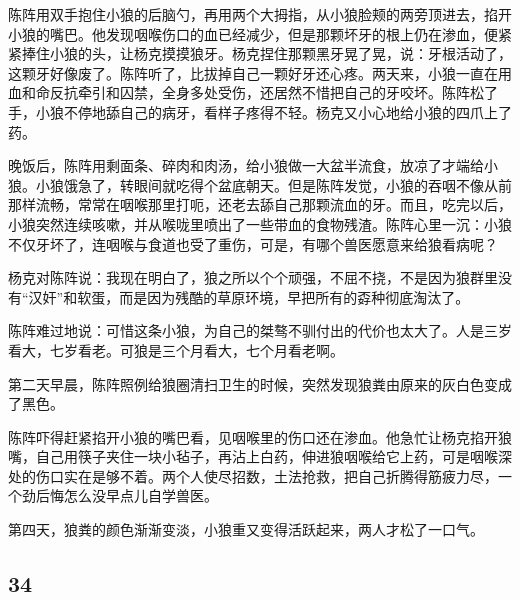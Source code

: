 \par 陈阵用双手抱住小狼的后脑勺，再用两个大拇指，从小狼脸颊的两旁顶进去，掐开小狼的嘴巴。他发现咽喉伤口的血已经减少，但是那颗坏牙的根上仍在渗血，便紧紧捧住小狼的头，让杨克摸摸狼牙。杨克捏住那颗黑牙晃了晃，说：牙根活动了，这颗牙好像废了。陈阵听了，比拔掉自己一颗好牙还心疼。两天来，小狼一直在用血和命反抗牵引和囚禁，全身多处受伤，还居然不惜把自己的牙咬坏。陈阵松了手，小狼不停地舔自己的病牙，看样子疼得不轻。杨克又小心地给小狼的四爪上了药。
\par 晚饭后，陈阵用剩面条、碎肉和肉汤，给小狼做一大盆半流食，放凉了才端给小狼。小狼饿急了，转眼间就吃得个盆底朝天。但是陈阵发觉，小狼的吞咽不像从前那样流畅，常常在咽喉那里打呃，还老去舔自己那颗流血的牙。而且，吃完以后，小狼突然连续咳嗽，并从喉咙里喷出了一些带血的食物残渣。陈阵心里一沉：小狼不仅牙坏了，连咽喉与食道也受了重伤，可是，有哪个兽医愿意来给狼看病呢？
\par 杨克对陈阵说：我现在明白了，狼之所以个个顽强，不屈不挠，不是因为狼群里没有“汉奸”和软蛋，而是因为残酷的草原环境，早把所有的孬种彻底淘汰了。
\par 陈阵难过地说：可惜这条小狼，为自己的桀骜不驯付出的代价也太大了。人是三岁看大，七岁看老。可狼是三个月看大，七个月看老啊。
\par 第二天早晨，陈阵照例给狼圈清扫卫生的时候，突然发现狼粪由原来的灰白色变成了黑色。
\par 陈阵吓得赶紧掐开小狼的嘴巴看，见咽喉里的伤口还在渗血。他急忙让杨克掐开狼嘴，自己用筷子夹住一块小毡子，再沾上白药，伸进狼咽喉给它上药，可是咽喉深处的伤口实在是够不着。两个人使尽招数，土法抢救，把自己折腾得筋疲力尽，一个劲后悔怎么没早点儿自学兽医。
\par 第四天，狼粪的颜色渐渐变淡，小狼重又变得活跃起来，两人才松了一口气。







\subsection*{34}




